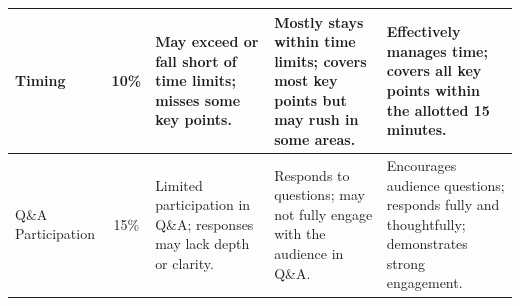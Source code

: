 \documentclass[11pt]{article}
\begin{document}
\begin{landscape}
\begin{table}
\begin{tabular}{p{.75in} c  p{2.25in}  p{2.25in}  p{2.25in}}
        \midrule
        Timing           		& 10\%\vspace{.25in}			& May exceed or fall short of time limits; misses some key points. & Mostly stays within time limits; covers most key points but may rush in some areas. & Effectively manages time; covers all key points within the allotted 15 minutes. \\
        \midrule
        Q\&A Participation 		& 15\%\vspace{.25in}			& Limited participation in Q\&A; responses may lack depth or clarity. & Responds to questions; may not fully engage with the audience in Q\&A. & Encourages audience questions; responds fully and thoughtfully; demonstrates strong engagement. \\
        \bottomrule
    \end{tabular}
\end{table}
\end{landscape}
\end{document}
